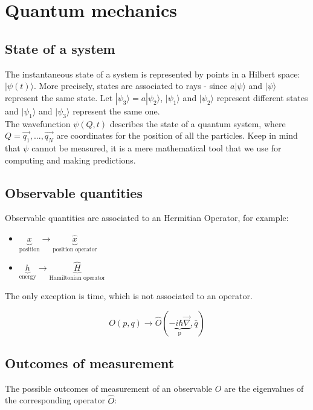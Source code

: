 \chapter{Quantum mechanics}

\section{State of a system}
The instantaneous state of a system is represented by points in a Hilbert space: $|\psi(t)\rangle$.
More precisely,  states are associated to rays - since $a|\psi\rangle$ and $|\psi\rangle$ represent the same state.
Let $|\psi_3\rangle = a |\psi_2\rangle$, $|\psi_1\rangle$ and $|\psi_2\rangle$ represent different states and $|\psi_1\rangle$ and $|\psi_3\rangle$ represent the same one.\\
\noindent
The wavefunction $\psi(Q,t)$ describes the state of a quantum system, where $Q=\vec{q_1},...,\vec{q_N}$ are coordinates for the position of all the particles.
Keep in mind that $\psi$ cannot be measured, it is a mere mathematical tool that we use for computing and making predictions.

\section{Observable quantities}
Observable quantities are associated to an Hermitian Operator, for example:

\begin{multicols}{2}
	\begin{itemize}
		\item $\underbrace{x}_{\text{position}}\rightarrow\underbrace{\hat{x}}_{\text{position operator}}$
		\item $\underbrace{h}_{\text{energy}}\rightarrow\underbrace{\hat{H}}_{\text{Hamiltonian operator}}$
	\end{itemize}
\end{multicols}

The only exception is time, which is not associated to an operator.

$$O(p,q)\rightarrow\hat{O}(\underbrace{-i\hbar\vec{\nabla}}_{\text{p}},\bar{q})$$

\section{Outcomes of measurement}
The possible outcomes of measurement of an observable $O$ are the eigenvalues of the corresponding operator $\hat{O}$:

